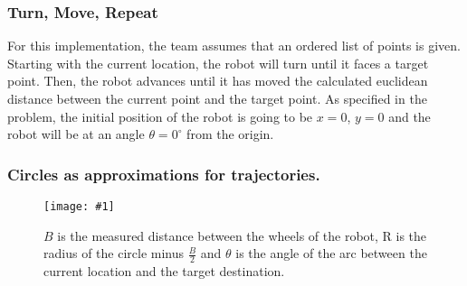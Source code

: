 \documentclass[12pt,conference,onecolumn]{IEEEtran} %
\newcommand{\myfigure}[4]{
  \begin{figure}[h!]
      \centering
      \texttt{[image: \#1]}
      \caption{#2}
\label{#4}
    \end{figure}
}
\begin{document}
\subsubsection{Turn, Move, Repeat}
For this implementation, the team assumes that an ordered list of points is given. Starting with the current location, the robot will turn until it faces a target point. Then, the robot advances until it has moved the calculated euclidean distance between the current point and the target point. As specified in the problem, the initial position of the robot is going to be $x=0$, $y=0$ and the robot will be at an angle $\theta=0^{\circ}$ from the origin.


\subsubsection{Circles as approximations for trajectories.}
\myfigure{images/robotCircle.png}{$B$ is the measured distance between the wheels 
of the robot, R is the radius of the circle minus $\frac{B}{2}$ and $\theta$ is the angle of the arc between the current location and the target destination.}{0.5}{fig:robotCircle}
\end{document}
